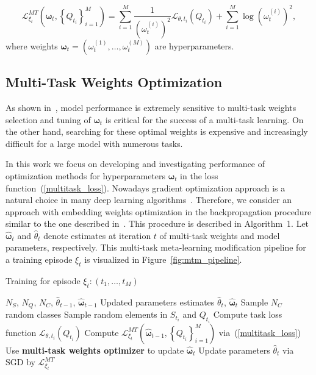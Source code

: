 \documentclass{article}
\begin{document}
\begin{equation}\label{multitask_loss}
\mathcal{L}^{MT}_{\xi_t}(\boldsymbol{\omega}_t, \left\lbrace Q_{t_i} \right\rbrace_{i=1}^{M}) = \sum_{i=1}^M \frac{1}{(\omega_t^{(i)})^2} \mathcal{L}_{\theta, t_i} (Q_{t_i}) + \sum_{i=1}^M \log (\omega_t^{(i)})^2,
\end{equation}
where weights $\boldsymbol{\omega}_t = (\omega_t^{(1)},\ldots,\omega_t^{(M)})$ are hyperparameters.

\subsection{Multi-Task Weights Optimization}\label{sec:mtm_optimizers}

As shown in~\cite{kendall2018multi}, model performance is extremely sensitive
to multi-task weights selection and tuning of $\boldsymbol{\omega}_t$ is critical for the success of a multi-task learning. On the other hand, searching for these optimal weights is expensive and increasingly difficult for a large model with numerous tasks.

In this work we focus on developing and investigating performance of optimization methods for hyperparameters $\boldsymbol{\omega}_t$ in the loss function~(\ref{multitask_loss}). Nowadays gradient optimization approach is a natural choice in many deep learning algorithms~\cite{He_2016_CVPR,kendall2018multi}. Therefore, we consider an approach with embedding weights optimization in the backpropagation procedure similar to the one described in~\cite{kendall2018multi}. This procedure is described in Algorithm~1. Let $\widehat{\boldsymbol{\omega}}_{t}$ and $\widehat{\theta}_{t}$ denote estimates at iteration $t$ of multi-task weights and model parameters, respectively. This multi-task meta-learning modification pipeline for a training episode $\xi_t$ is visualized in Figure~\ref{fig:mtm_pipeline}.

\begin{algorithm}\label{alg:multi-task_weights_optimizer}
\begin{algorithmic}[1]
\caption{Training for episode $\xi_t: (t_1,\ldots,t_M)$}
\renewcommand{\algorithmicrequire}{\textbf{Input:}}
\renewcommand{\algorithmicensure}{\textbf{Output:}}
\REQUIRE $N_S$, $N_Q$, $N_C$, $\widehat{\theta}_{t-1}$, $\widehat{\boldsymbol{\omega}}_{t-1}$
\ENSURE Updated parameters estimates $\widehat{\theta}_{t}$, $\widehat{\boldsymbol{\omega}}_{t}$
\STATE Sample $N_C$ random classes
\STATE Sample random elements in $S_{t_i}$ and $Q_{t_i}$ 
\STATE Compute task loss function $\mathcal{L}_{\theta, t_i} (Q_{t_i})$
\ENDFOR
\STATE Compute $\mathcal{L}^{MT}_{\xi_t}(\widehat{\boldsymbol{\omega}}_{t-1}, \left\lbrace Q_{t_i} \right\rbrace_{i=1}^{M})$ via~(\ref{multitask_loss})
\STATE Use {\bf multi-task weights optimizer} to update $\widehat{\boldsymbol{\omega}}_{t}$
\STATE Update parameters $\widehat{\theta}_{t}$ via SGD by $\mathcal{L}^{MT}_{\xi_t}$
\end{algorithmic}
\end{algorithm}
\end{document}
